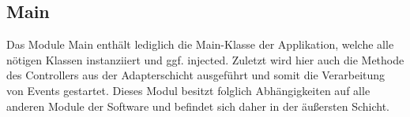 \subsection{Main}
Das Module Main enthält lediglich die Main-Klasse der Applikation, welche alle nötigen Klassen instanziiert und ggf. injected. Zuletzt wird hier auch die Methode  des Controllers aus der Adapterschicht ausgeführt und somit die Verarbeitung von Events gestartet. Dieses Modul besitzt folglich Abhängigkeiten auf alle anderen Module der Software und befindet sich daher in der äußersten Schicht.
